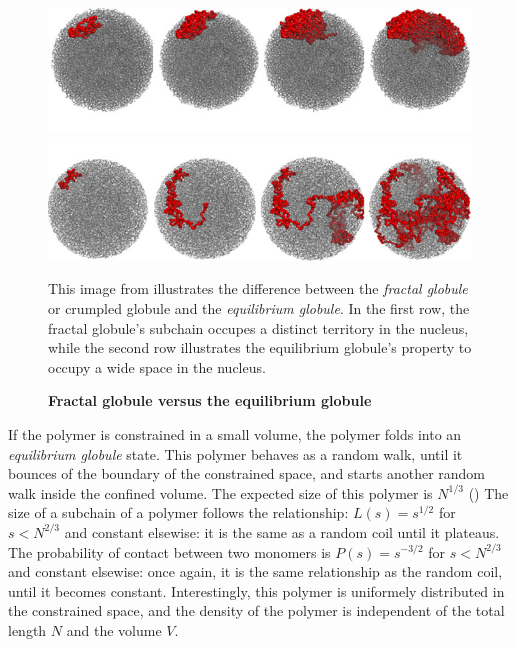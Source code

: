 

\begin{figure}
\begin{center}
\includegraphics[width=0.8\linewidth]{figures/mirny_fractal.png}
\includegraphics[width=0.8\linewidth]{figures/mirny_equilibrium.png}
\end{center}
\caption{\textbf{Fractal globule versus the equilibrium globule}}{This image
from \citet{mirny:fractal} illustrates the difference between the
\textit{fractal globule} or crumpled globule and the
\textit{equilibrium globule}. In the first row, the
fractal globule's subchain occupes a distinct territory in the nucleus, while
the second row illustrates the equilibrium globule's property to occupy a wide
space in the nucleus.}
\end{figure}

If the polymer is constrained in a small volume, the polymer folds into an
\textit{equilibrium globule} state. This polymer behaves as a random walk,
until it bounces of the boundary of the constrained space, and starts another
random walk inside the confined volume. The expected size of this polymer is
$N^{1/3}$ () The size of a subchain of a polymer follows the relationship: $L(s) =
s^{1/2}$ for $s < N^{2/3}$ and constant elsewise: it is the same as a random
coil until it plateaus. The probability of contact between two monomers is
$P(s) = s^{-3/2}$ for $s < N^{2/3}$ and constant elsewise: once again, it is
the same relationship as the random coil, until it becomes constant.
Interestingly, this polymer is uniformely distributed in the constrained
space, and the density of the polymer is independent of the total length $N$
and the volume $V$.

